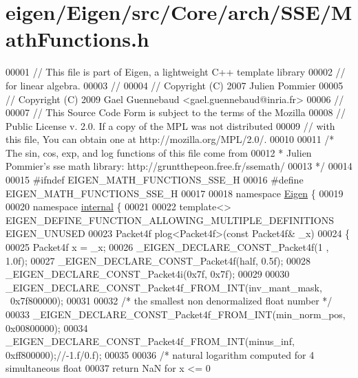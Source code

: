 \hypertarget{eigen_2_eigen_2src_2_core_2arch_2_s_s_e_2_math_functions_8h_source}{}\section{eigen/\+Eigen/src/\+Core/arch/\+S\+S\+E/\+Math\+Functions.h}
\label{eigen_2_eigen_2src_2_core_2arch_2_s_s_e_2_math_functions_8h_source}

\begin{DoxyCode}
00001 \textcolor{comment}{// This file is part of Eigen, a lightweight C++ template library}
00002 \textcolor{comment}{// for linear algebra.}
00003 \textcolor{comment}{//}
00004 \textcolor{comment}{// Copyright (C) 2007 Julien Pommier}
00005 \textcolor{comment}{// Copyright (C) 2009 Gael Guennebaud <gael.guennebaud@inria.fr>}
00006 \textcolor{comment}{//}
00007 \textcolor{comment}{// This Source Code Form is subject to the terms of the Mozilla}
00008 \textcolor{comment}{// Public License v. 2.0. If a copy of the MPL was not distributed}
00009 \textcolor{comment}{// with this file, You can obtain one at http://mozilla.org/MPL/2.0/.}
00010 
00011 \textcolor{comment}{/* The sin, cos, exp, and log functions of this file come from}
00012 \textcolor{comment}{ * Julien Pommier's sse math library: http://gruntthepeon.free.fr/ssemath/}
00013 \textcolor{comment}{ */}
00014 
00015 \textcolor{preprocessor}{#ifndef EIGEN\_MATH\_FUNCTIONS\_SSE\_H}
00016 \textcolor{preprocessor}{#define EIGEN\_MATH\_FUNCTIONS\_SSE\_H}
00017 
00018 \textcolor{keyword}{namespace }\hyperlink{namespace_eigen}{Eigen} \{
00019 
00020 \textcolor{keyword}{namespace }\hyperlink{namespaceinternal}{internal} \{
00021 
00022 \textcolor{keyword}{template}<> EIGEN\_DEFINE\_FUNCTION\_ALLOWING\_MULTIPLE\_DEFINITIONS EIGEN\_UNUSED
00023 Packet4f plog<Packet4f>(\textcolor{keyword}{const} Packet4f& \_x)
00024 \{
00025   Packet4f x = \_x;
00026   \_EIGEN\_DECLARE\_CONST\_Packet4f(1 , 1.0f);
00027   \_EIGEN\_DECLARE\_CONST\_Packet4f(half, 0.5f);
00028   \_EIGEN\_DECLARE\_CONST\_Packet4i(0x7f, 0x7f);
00029 
00030   \_EIGEN\_DECLARE\_CONST\_Packet4f\_FROM\_INT(inv\_mant\_mask, ~0x7f800000);
00031 
00032   \textcolor{comment}{/* the smallest non denormalized float number */}
00033   \_EIGEN\_DECLARE\_CONST\_Packet4f\_FROM\_INT(min\_norm\_pos,  0x00800000);
00034   \_EIGEN\_DECLARE\_CONST\_Packet4f\_FROM\_INT(minus\_inf,     0xff800000);\textcolor{comment}{//-1.f/0.f);}
00035 
00036   \textcolor{comment}{/* natural logarithm computed for 4 simultaneous float}
00037 \textcolor{comment}{    return NaN for x <= 0}

\end{DoxyCode}
